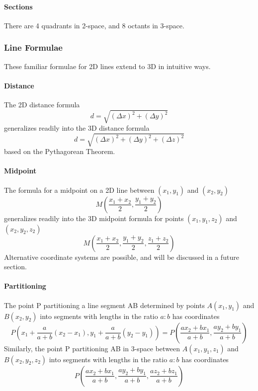 \documentclass{article}
\begin{document}
\paragraph{Sections}
There are 4 quadrants in 2-space, and 8 octants in 3-space.

\subsubsection{Line Formulae}
These familiar formulae for 2D lines extend to 3D in intuitive ways.

\paragraph{Distance}
The 2D distance formula
$$d = \sqrt{(\Delta x)^2 + (\Delta y)^2}$$
generalizes readily into the 3D distance formula
$$d = \sqrt{(\Delta x)^2 + (\Delta y)^2 + (\Delta z)^2}$$
based on the Pythagorean Theorem.

\paragraph{Midpoint}
The formula for a midpoint on a 2D line between $(x_1, y_1)$ and $(x_2, y_2)$
$$M\left(\frac{x_1+x_2}{2},\frac{y_1+y_2}{2}\right)$$
generalizes readily into the 3D midpoint formula for points $(x_1, y_1, z_2)$ and $(x_2, y_2, z_2)$
$$M\left(\frac{x_1+x_2}{2},\frac{y_1+y_2}{2}, \frac{z_1+z_2}{2}\right)$$
Alternative coordinate systems are possible, and will be discussed in a future section.

\paragraph{Partitioning}
The point P partitioning a line segment AB determined by points $A(x_1,y_1)$ and $B(x_2,y_2)$ into segments with lengths in the ratio $a:b$ has coordinates
$$P\left(x_1+\frac{a}{a+b}\left(x_2-x_1\right), y_1+\frac{a}{a+b}\left(y_2-y_1\right)\right) = P\left(\frac{ax_2 + bx_1}{a+b}, \frac{ay_2 + by_1}{a+b}\right)$$
Similarly, the point P partitioning AB in 3-space between $A(x_1, y_1, z_1)$ and $B(x_2, y_2, z_2)$ into segments with lengths in the ratio $a:b$ has coordinates
$$P\left(\frac{ax_2 + bx_1}{a+b}, \frac{ay_2 + by_1}{a+b}, \frac{az_2 + bz_1}{a+b}\right)$$
\end{document}
